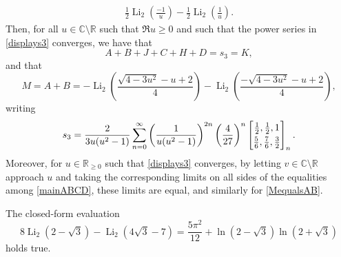 \documentclass[10pt,a4paper]{amsart}
\begin{document}
\begin{theorem}
\begin{align*}
 \frac{1}{2} \operatorname{Li}_2 \left( \frac{-1}{u} \right) - 
 \frac{1}{2} \operatorname{Li}_2 \left( \frac{1}{u} \right). 
\end{align*} 
 Then, for all $u \in \mathbb{C} \setminus \mathbb{R}$ such that $\Re u \geq 0$ and such that the power series 
 in \eqref{displays3} converges, we have that 
\begin{equation}\label{mainABCD}
 A + B + J + C + H + D = s_3 = K, 
\end{equation}
 and that 
\begin{equation}\label{MequalsAB}
 M = A + B = 
 - \operatorname{Li}_{2}\left( \frac{\sqrt{4 - 3 u^2} - u + 2}{4} \right) 
 - \operatorname{Li}_{2}\left( \frac{-\sqrt{4 - 3 u^2} - u + 2}{4} \right), 
\end{equation}
 writing 
\begin{equation}\label{displays3}
 s_3 = \frac{2}{3u(u^2-1)} \sum_{n=0}^{\infty} \left( \frac{1}{u(u^2-1)} \right)^{2n} \left( \frac{4}{27} \right)^{n} 
 \left[ \begin{matrix} \frac{1}{2}, \frac{1}{2}, 1 
 \vspace{1mm} \\ 
 \frac{5}{6}, \frac{7}{6}, \frac{3}{2} \end{matrix} \right]_{n}. 
\end{equation}
 Moreover, for $u \in \mathbb{R}_{\geq 0}$ such that \eqref{displays3} converges, by letting $v \in \mathbb{C} \setminus \mathbb{R}$ 
 approach $u$ and taking the corresponding limits on all sides of the equalities among \eqref{mainABCD}, these limits are equal, 
 and similarly for \eqref{MequalsAB}. 
\end{theorem}

\begin{theorem}\label{theoremSunCampbell}
 The closed-form evaluation
 $$ 8 \operatorname{Li}_2\left(2-\sqrt{3}\right)-\operatorname{Li}_2\left(4 \sqrt{3} - 7 \right) 
 = \frac{5 \pi ^2}{12}+\ln \left(2-\sqrt{3}\right) \ln \left(2+\sqrt{3}\right) $$
 holds true.
\end{theorem}
\end{document}
